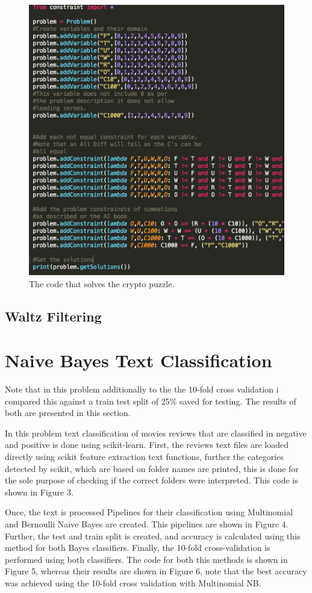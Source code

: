\documentclass[12pt, letter]{article}
\begin{document}
 \begin{figure}[htb]
  \centering
  \includegraphics[width=0.80 \textwidth]{./figures/csp_code.png}
  \caption{The code that solves the crypto puzzle.}
\end{figure}

\FloatBarrier

\subsection{Waltz Filtering}

\section{Naive Bayes Text Classification}

Note that in this problem additionally to the  the 10-fold cross validation i compared this against a train test split of 25\% saved for testing. The results of both are presented in this section. 

In this problem text classification of movies reviews that are classified in negative and positive is done using scikit-learn. First, the reviews text files are loaded directly using scikit feature extraction text functions, further the categories detected by scikit, which are based on folder names are printed, this is done for the sole purpose of checking if the correct folders were interpreted. This code is shown in Figure 3.

Once, the text is processed Pipelines for their classification using Multinomial and Bernoulli Naive Bayes are created. This pipelines are shown in Figure 4. Further, the test and train split is created, and accuracy is calculated using this method for both Bayes classifiers. Finally, the 10-fold cross-validation is performed using both classifiers. The code for both this methods is shown in Figure 5, whereas their results are shown in Figure 6, note that the best accuracy was achieved using the 10-fold cross validation with Multinomial NB. 
\end{document}
